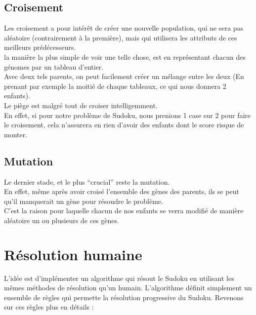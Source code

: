        \subsection{Croisement}
            Les croisement a pour intérêt de créer une nouvelle population, qui ne sera pas aléatoire (contrairement à la première), mais qui utilisera les attributs de ces meilleurs prédécesseurs.\\
            la manière la plus simple de voir une telle chose, est en représentant chacun des génomes par un tableau d'entier.\\
            Avec deux tels parents, on peut facilement créer un mélange entre les deux (En prenant par exemple la moitié de chaque tableaux, ce qui nous donnera 2 enfants).\\
            Le piège est malgré tout de croiser intelligemment.\\
            En effet, si pour notre problème de Sudoku, nous prenions 1 case sur 2 pour faire le croisement, cela n'assurera en rien d'avoir des enfants dont le score risque de monter.
        \subsection{Mutation}
            Le dernier stade, et le plus ``crucial'' reste la mutation.\\
            En effet, même après avoir croisé l'ensemble des gènes des parents, ils se peut qu'il manquerait un gène pour résoudre le problème.\\
            C'est la raison pour laquelle chacun de nos enfants se verra modifié de manière aléatoire un ou plusieurs de ces gènes.
    \section{Résolution humaine}



        L'idée est d'implémenter un algorithme qui résout le Sudoku en utilisant les mêmes méthodes de résolution qu'un humain. L'algorithme définit simplement un ensemble de règles qui permette la résolution progressive du Sudoku. Revenons sur ces règles plus en détails :

